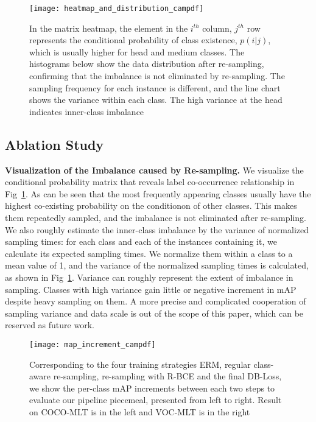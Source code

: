 \documentclass[runningheads]{llncs}
\begin{document}
\begin{figure}[t]
    \centering
    \texttt{[image: heatmap\_and\_distribution\_campdf]}
    \caption{
        In the matrix heatmap, the element in the $i^{th}$ column, $j^{th}$ row represents the conditional probability of class existence, $p(i|j)$, which is usually higher for head and medium classes.
        The histograms below show the data distribution after re-sampling, confirming that the imbalance is not eliminated by re-sampling.
        The sampling frequency for each instance is different, and the line chart shows the variance within each class. The high variance at the head indicates inner-class imbalance
        }
    \label{fig:heatmap_and_distribution}
\end{figure}

\subsection{Ablation Study}

\noindent\textbf{Visualization of the Imbalance caused by Re-sampling.}
We visualize the conditional probability matrix that reveals label co-occurrence relationship in Fig~\ref{fig:heatmap_and_distribution}. As can be seen that the most frequently appearing classes usually have the highest co-existing probability on the conditionon of other classes. This makes them repeatedly sampled, and the imbalance is not eliminated after re-sampling.
We also roughly estimate the inner-class imbalance by the variance of normalized sampling times: 
for each class and each of the instances containing it, we calculate its expected sampling times. We normalize them within a class to a mean value of 1, and the variance of the normalized sampling times is calculated, as shown in Fig~\ref{fig:heatmap_and_distribution}. 
Variance can roughly represent the extent of imbalance in sampling.
Classes with high variance gain little or negative increment in mAP despite heavy sampling on them. 
A more precise and complicated cooperation of sampling variance and data scale is out of the scope of this paper, which can be reserved as future work.
\begin{figure}[t]
    \centering
    \texttt{[image: map\_increment\_campdf]}
    \caption{
    Corresponding to the four training strategies \ie ERM, regular class-aware re-sampling, re-sampling with R-BCE and the final DB-Loss, we show the per-class mAP increments between each two steps to evaluate our pipeline piecemeal, presented from left to right.
    Result on COCO-MLT is in the left and VOC-MLT is in the right
    } 
    \label{fig:map_increment}
\end{figure}
\end{document}
